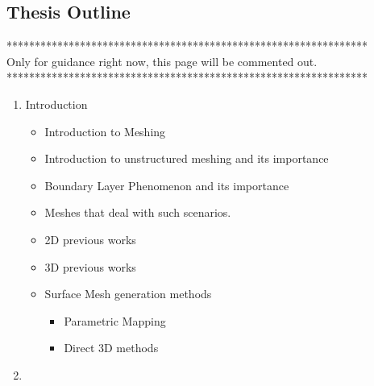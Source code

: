 %
\subsection*{Thesis Outline}

****************************************************************\\
Only for guidance right now, this page will be commented out. \\
****************************************************************

\begin{enumerate}
  \item Introduction
    \begin{itemize}
      \item Introduction to Meshing
      \item Introduction to unstructured meshing and its importance
      \item Boundary Layer Phenomenon and its importance
      \item Meshes that deal with such scenarios.
      \item 2D previous works
      \item 3D previous works
      \item Surface Mesh generation methods
        \begin{itemize}
          \item Parametric Mapping
          \item Direct 3D methods
        \end{itemize}
    \end{itemize}
  \item   
\end{enumerate}
\endinput
